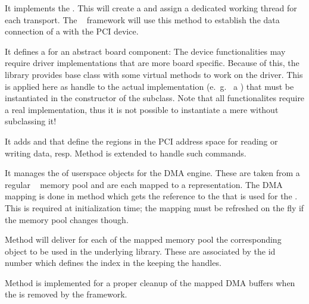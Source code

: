 \begin{compactenum} 

\item It implements the  . 
This will create a  and assign a dedicated working thread 
for each transport. The \dabc~ framework will use this method to establish
the data connection of a  with the PCI device.

\item It defines a  for an abstract board component:
The device functionalities may require driver implementations that are more
board specific. Because of this, the  library
provides base class  with some virtual methods to work on the
driver. This is applied here as handle to the actual  
implementation (e.~g.~ a )
that must be instantiated in the constructor of the
subclass. Note that all functionalites require a
real  implementation, thus it is not possible
to instantiate a mere  without subclassing it! 

\item It adds   
 and
 that define the regions in
the PCI address space for reading or writing data, resp.
Method  is extended 
to handle such commands. 

\item It manages the  of userspace 
 objects for the DMA engine.
These are taken from a regular \dabc~ memory pool
and are each mapped to a  representation. 
The DMA mapping is done  
in method  which gets the reference to 
the  that is used for the . 
This is required at  initialization time; 
the mapping must be refreshed 
on the fly if the memory pool changes though.

Method  
will deliver for each  of the mapped memory pool 
the corresponding  object to be used in the
underlying  library. These are associated by the 
 id number which defines 
the index in the  keeping the 
handles. 

Method  is implemented for 
a proper cleanup of the mapped DMA buffers when the 
is removed by the framework.




\end{compactenum}
